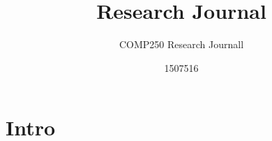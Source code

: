 \documentclass{scrartcl}
\title{Research Journal}
\subtitle{COMP250 Research Journall}
\author{1507516}
\begin{document}
\maketitle

\section{Intro}
\end{document}
